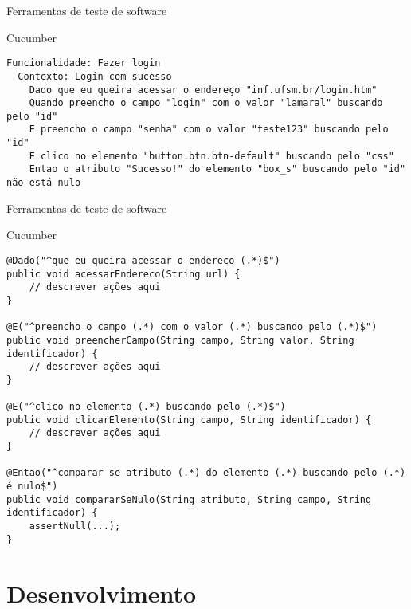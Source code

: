 \documentclass{beamer}
\begin{document}
\begin{frame}[fragile]{Ferramentas de teste de software}
    \item Cucumber
    \begin{lstlisting}
Funcionalidade: Fazer login
  Contexto: Login com sucesso
    Dado que eu queira acessar o endereço "inf.ufsm.br/login.htm"
    Quando preencho o campo "login" com o valor "lamaral" buscando pelo "id"
    E preencho o campo "senha" com o valor "teste123" buscando pelo "id"
    E clico no elemento "button.btn.btn-default" buscando pelo "css"
    Entao o atributo "Sucesso!" do elemento "box_s" buscando pelo "id" não está nulo
	\end{lstlisting}
\end{frame}
\begin{frame}[fragile]{Ferramentas de teste de software}
    \item Cucumber
    \begin{lstlisting}
@Dado("^que eu queira acessar o endereco (.*)$")
public void acessarEndereco(String url) {
    // descrever ações aqui
}

@E("^preencho o campo (.*) com o valor (.*) buscando pelo (.*)$")
public void preencherCampo(String campo, String valor, String identificador) {
    // descrever ações aqui
}

@E("^clico no elemento (.*) buscando pelo (.*)$")
public void clicarElemento(String campo, String identificador) {
    // descrever ações aqui
}

@Entao("^comparar se atributo (.*) do elemento (.*) buscando pelo (.*) é nulo$")
public void compararSeNulo(String atributo, String campo, String identificador) {
    assertNull(...);
}

	\end{lstlisting}
\end{frame}
\section{Desenvolvimento}
\end{document}
